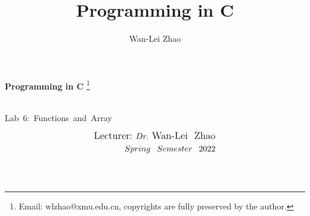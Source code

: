 \documentclass[t]{beamer}
\title{Programming in C}
\author{Wan-Lei Zhao}
\newcommand\blfootnote[1]{
  \begingroup
  \renewcommand\thefootnote{}\footnote{#1}
  \addtocounter{footnote}{-1}
  \endgroup
}
\begin{document}
\begin{frame}
   \begin{center}
    \vspace{24pt}
    \Huge\textbf{Programming in C}\blfootnote{Email: wlzhao@xmu.edu.cn, copyrights are fully preserved by the author.}\\
     \Huge{\mbox{Lab 6: Functions and Array}}
    \vspace{36pt}
  \end{center}
  \begin{align*}
   \vspace{18pt}
      \large{\mbox{Lecturer:}~Dr.~\mbox{Wan-Lei~~Zhao}} \\
      \large{Spring~~Semester~~2022} \\
   \vspace{30pt}
  \end{align*}
\end{frame}



\section{}
\end{document}
